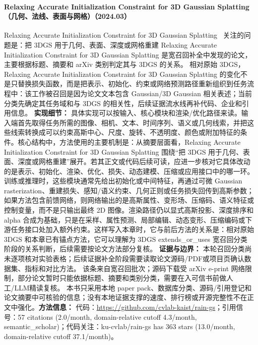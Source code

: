 \paragraph{Relaxing Accurate Initialization Constraint for 3D Gaussian Splatting（几何、法线、表面与网格）（2024.03）}
Relaxing Accurate Initialization Constraint for 3D Gaussian Splatting~\cite{2403_09413} 关注的问题是：把 3DGS 用于几何、表面、深度或网格重建 Relaxing Accurate Initialization Constraint for 3D Gaussian Splatting 是宽召回补全中发现的论文，主要根据标题、摘要和 arXiv 类别判定其与 3DGS 的关系。
相对原始 3DGS，Relaxing Accurate Initialization Constraint for 3D Gaussian Splatting 的变化不是只替换损失函数，而是把表示、初始化、约束或网络预测路径重新组织到任务流程中：该工作被召回是因为论文文本包含 Gaussian/3D Gaussian 相关表述；当前分类先确定其任务域和与 3DGS 的相关性，后续证据流水线再补代码、企业和引用信息。
\textbf{实现细节：} 具体实现可以按输入、核心模块和渲染/优化路径来读。输入端首先取得任务所需的图像、相机、文本、时间序列、语义或几何线索，并把这些线索转换成可以约束高斯中心、尺度、旋转、不透明度、颜色或附加特征的条件。核心结构中，方法使用的主要机制是：从摘要层面看，Relaxing Accurate Initialization Constraint for 3D Gaussian Splatting 围绕“把 3DGS 用于几何、表面、深度或网格重建”展开。若其正文或代码后续可读，应进一步核对它具体改动的是表示、初始化、渲染、优化、损失、动态建模、压缩或应用接口中的哪一环。 训练或推理时，这些模块通常先给出初始化或中间特征，再通过可微 Gaussian rasterization、重建损失、感知/语义约束、几何正则或任务损失回传到高斯参数；如果方法包含前馈网络，则网络输出的是高斯属性、变形场、压缩码、语义特征或控制变量，而不是只输出最终 2D 图像。渲染路径仍以显式高斯投影、深度排序和 alpha 合成为基础，只是在采样、属性预测、局部编辑、动态变形、压缩编码或下游任务接口处加入额外约束。这样写入本章时，它与前后方法的关系是：相对原始 3DGS 和本章已有锚点方法，它可以理解为 3DGS extends\_or\_uses 宽召回分类阶段的关系判断，后续需要按论文方法部分复核。
\textbf{证据与边界：} 本轮召回分类尚未逐项核对实验表格；后续证据补全阶段需要读取论文源码/PDF或项目页确认数据集、指标和对比方法。 该条来自宽召回批次；源码下载受 arXiv e-print 网络限制，部分论文暂时只能依据标题、摘要和类别分类，需要在入可信书前做人工/LLM精读复核。 本书只采用本地 paper pack、数据库分类、源码/引用登记和论文摘要中可核验的信息；没有本地证据支撑的速度、排行榜或开源完整性不在正文中强化。\textbf{方法信息：} 代码：\url{https://github.com/cvlab-kaist/rain-gs}；引用信号：57 citations (2.0/month, domain-relative cutoff 4.3/month, semantic\_scholar)；代码关注：ku-cvlab/rain-gs has 363 stars (13.0/month, domain-relative cutoff 37.1/month)。
